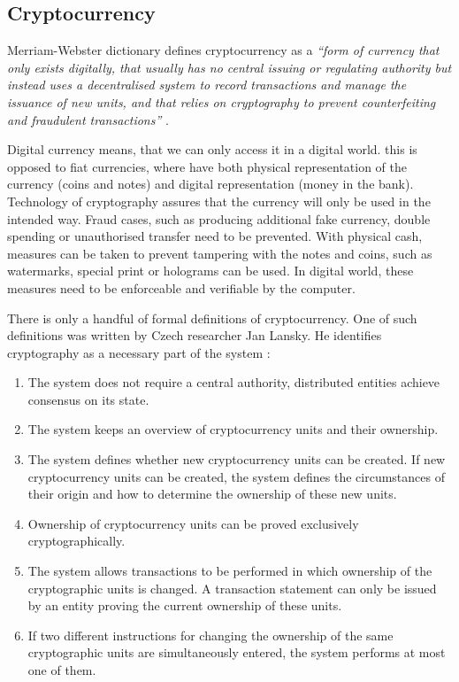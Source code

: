 \subsection{Cryptocurrency}
% 
Merriam-Webster dictionary defines cryptocurrency as a \textit{``form of currency that only exists digitally, that usually has no central issuing or regulating authority but instead uses a decentralised system to record transactions and manage the issuance of new units, and that relies on cryptography to prevent counterfeiting and fraudulent transactions''} \footnotemark.
% 

Digital currency means, that we can only access it in a digital world. this is opposed to fiat currencies, where have both physical representation of the currency (coins and notes) and digital representation (money in the bank). Technology of cryptography assures that the currency will only be used in the intended way. Fraud cases, such as producing additional fake currency, double spending or unauthorised transfer need to be prevented. With physical cash, measures can be taken to prevent tampering with the notes and coins, such as watermarks, special print or holograms can be used. In digital world, these measures need to be enforceable and verifiable by the computer.

There is only a handful of formal definitions of cryptocurrency. One of such definitions was written by Czech researcher Jan Lansky. He identifies cryptography as a necessary part of the system \cite{Lansky2018PossibleCryptocurrencies}:
\begin{enumerate}[noitemsep]
    \item The system does not require a central authority, distributed entities achieve consensus on its state.
    \item The system keeps an overview of cryptocurrency units and their ownership.
    \item The system defines whether new cryptocurrency units can be created. If new cryptocurrency units can  be  created,  the  system  defines  the  circumstances  of  their  origin  and  how  to  determine  the ownership of these new units.
    \item Ownership of cryptocurrency units can be proved exclusively cryptographically.
    \item The system allows transactions to be performed in  which ownership of the cryptographic units is changed. A transaction statement can only be issued by an entity proving the current ownership of these units.
    \item If  two  different  instructions  for  changing  the  ownership  of the  same  cryptographic  units  are simultaneously entered, the system performs at most one of them.
\end{enumerate}

